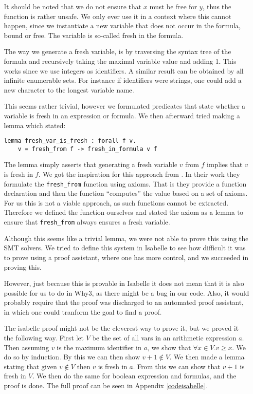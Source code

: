 It should be noted that we do not ensure that $x$ must be free for $y$,
thus the function is rather unsafe.
We only ever use it in a context where this cannot happen, since we instantiate a new variable that does not occur in the formula, bound or free. The variable is so-called fresh in the formula.

The way we generate a fresh variable, is by traversing the syntax tree of the formula and recursively taking the maximal variable value and adding 1.
This works since we use integers as identifiers.
A similar result can be obtained by all infinite enumerable sets. For instance if identifiers were strings, one could add a new character to the longest variable name.

This seems rather trivial, however we formulated predicates that state whether a variable is fresh in an expression or formula. We then afterward tried making a lemma which stated:

\begin{lstlisting}
lemma fresh_var_is_fresh : forall f v.
    v = fresh_from f -> fresh_in_formula v f
\end{lstlisting}

The lemma simply asserts that generating a fresh variable $v$ from $f$ implies that $v$ is fresh in $f$.
We got the inspiration for this approach from \cite{wp-revisited}.
In their work they formulate the \texttt{fresh\_from} function using axioms.
That is they provide a function declaration and then the function ``computes'' the value based on a set of axioms.
For us this is not a viable approach, as such functions cannot be extracted.
Therefore we defined the function ourselves and stated the axiom as a lemma to ensure that \texttt{fresh\_from} always ensures a fresh variable.

Although this seems like a trivial lemma, we were not able to prove this using the SMT solvers.
We tried to define this system in Isabelle to see how difficult it was to prove using a proof assistant, where one has more control, and we succeeded in proving this.

However, just because this is provable in Isabelle it does not mean that it is also possible
for us to do in Why3, as there might be a bug in our code.
Also, it would probably require that the proof was discharged to an automated proof assistant, in which one could tranform the goal to find a proof.

The isabelle proof might not be the cleverest way to prove it, but we proved it the following way.
First let $V$ be the set of all vars in an arithmetic expression $a$.
Then assuming $v$ is the maximum identifier in $a$, we show that $\forall x \in V. v \geq x$. We do so by induction.
By this we can then show $v + 1 \notin V$.
We then made a lemma stating that given $v \notin V$ then $v$ is fresh in $a$.
From this we can show that $v + 1$ is fresh in $V$.
We then do the same for boolean expression and formulas, and the proof is done.
The full proof can be seen in Appendix \ref{codeisabelle}.
